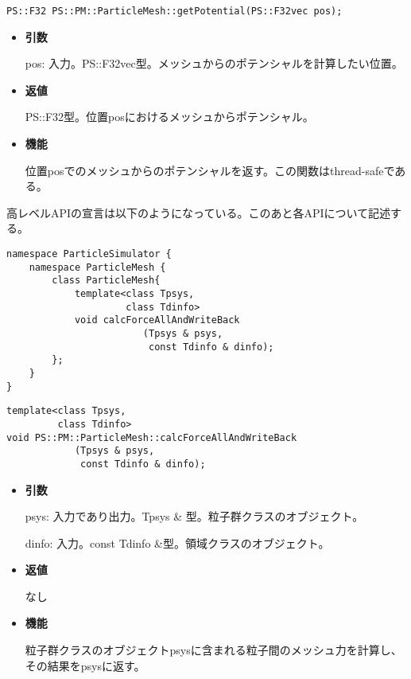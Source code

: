
\begin{screen}
\begin{verbatim}
PS::F32 PS::PM::ParticleMesh::getPotential(PS::F32vec pos);
\end{verbatim}
\end{screen}

\begin{itemize}

\item {\bf 引数}

  pos: 入力。PS::F32vec型。メッシュからのポテンシャルを計算したい位置。

\item {\bf 返値}

  PS::F32型。位置posにおけるメッシュからポテンシャル。

\item {\bf 機能}

  位置posでのメッシュからのポテンシャルを返す。この関数はthread-safeである。

\end{itemize}



高レベルAPIの宣言は以下のようになっている。このあと各APIについて記述す
る。
\begin{lstlisting}[caption=ParticleMesh1]
namespace ParticleSimulator {
    namespace ParticleMesh {
        class ParticleMesh{
            template<class Tpsys,
                     class Tdinfo>
            void calcForceAllAndWriteBack
                        (Tpsys & psys,
                         const Tdinfo & dinfo);
        };
    }
}
\end{lstlisting}


\begin{screen}
\begin{verbatim}
template<class Tpsys,
         class Tdinfo>
void PS::PM::ParticleMesh::calcForceAllAndWriteBack
            (Tpsys & psys,
             const Tdinfo & dinfo);
\end{verbatim}
\end{screen}

\begin{itemize}

\item {\bf 引数}

  psys: 入力であり出力。Tpsys \& 型。粒子群クラスのオブジェクト。

  dinfo: 入力。const Tdinfo \&型。領域クラスのオブジェクト。

\item {\bf 返値}

  なし

\item {\bf 機能}

  粒子群クラスのオブジェクトpsysに含まれる粒子間のメッシュ力を計算し、
  その結果をpsysに返す。

\end{itemize}

